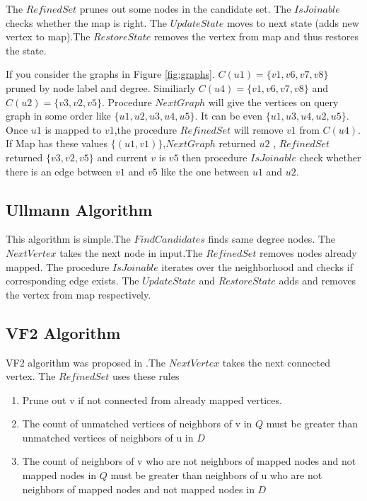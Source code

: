 \hspace{10mm}The $RefinedSet$  prunes out some nodes in the candidate set.  The $ IsJoinable$ checks whether the map is right. The $UpdateState$ moves to next state (adds new vertex to map).The $RestoreState$ removes the vertex from map and thus restores the state.

\hspace{10mm} If you consider the graphs in Figure \ref{fig:graphs}. $C(u1)=\{v1,v6,v7,v8\}$ pruned by node label and degree. Similiarly $C(u4)=\{v1,v6,v7,v8\}$ and $C(u2)=\{v3,v2,v5\}$. Procedure $NextGraph$ will give the vertices on query graph in some order like $\{u1,u2,u3,u4,u5\}$. It can be even $\{ u1, u3,u4,u2,u5\}$. Once $ u1$ is mapped to $v1$,the procedure $RefinedSet$ will remove $v1$ from $C(u4)$. If Map has these values $\{(u1,v1)\}$,$NextGraph$ returned $u2$ , $RefinedSet$ returned $\{v3,v2,v5\}$ and current $v$ is $v5$ then procedure $IsJoinable$ check whether there is an edge between $v1 $ and $v5$ like the one between $u1$ and $u2$.  
\subsection{Ullmann Algorithm}
\label{sec:ullmann}
\hspace{10mm}This algorithm\cite{Ull} is simple.The $FindCandidates$ finds same degree nodes. The $NextVertex$ takes the next node in input.The $RefinedSet$ removes nodes already mapped.  The procedure $ IsJoinable$ iterates over the neighborhood and checks if corresponding edge exists. The $UpdateState$ and $RestoreState$ adds and removes the vertex from map respectively.
\subsection{VF2 Algorithm}
\label{sec:vf2}
\hspace{10mm}VF2 algorithm was proposed in \cite{VF2}.The $NextVertex$ takes the next connected vertex. The $RefinedSet$ uses these rules
 \begin{enumerate}
 \item Prune out v if not connected from already mapped vertices.
 \item The count of unmatched vertices of neighbors of v in $Q$ must be greater than unmatched vertices of neighbors of u in $D$
 \item The count of neighbors of v who are not neighbors of mapped nodes and not mapped nodes in $Q$ must be greater than neighbors of u who are not neighbors of mapped nodes and not mapped nodes in $D$
 \end{enumerate}
